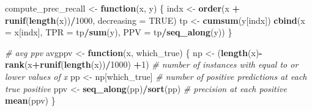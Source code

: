 \documentclass[
]{article}
\newenvironment{Shaded}{\begin{snugshade}}{\end{snugshade}}
\newcommand{\AttributeTok}[1]{\textcolor[rgb]{0.13,0.29,0.53}{#1}}
\newcommand{\CommentTok}[1]{\textcolor[rgb]{0.56,0.35,0.01}{\textit{#1}}}
\newcommand{\ConstantTok}[1]{\textcolor[rgb]{0.56,0.35,0.01}{#1}}
\newcommand{\ControlFlowTok}[1]{\textcolor[rgb]{0.13,0.29,0.53}{\textbf{#1}}}
\newcommand{\DecValTok}[1]{\textcolor[rgb]{0.00,0.00,0.81}{#1}}
\newcommand{\FunctionTok}[1]{\textcolor[rgb]{0.13,0.29,0.53}{\textbf{#1}}}
\newcommand{\NormalTok}[1]{#1}
\newcommand{\OtherTok}[1]{\textcolor[rgb]{0.56,0.35,0.01}{#1}}
\newcommand{\SpecialCharTok}[1]{\textcolor[rgb]{0.81,0.36,0.00}{\textbf{#1}}}
\begin{document}
\begin{Shaded}
\begin{Highlighting}[]
\NormalTok{compute\_prec\_recall }\OtherTok{\textless{}{-}} \ControlFlowTok{function}\NormalTok{(x, y) \{}
\NormalTok{  indx }\OtherTok{\textless{}{-}} \FunctionTok{order}\NormalTok{(x }\SpecialCharTok{+} \FunctionTok{runif}\NormalTok{(}\FunctionTok{length}\NormalTok{(x))}\SpecialCharTok{/}\DecValTok{1000}\NormalTok{, }\AttributeTok{decreasing =} \ConstantTok{TRUE}\NormalTok{)}
\NormalTok{  tp  }\OtherTok{\textless{}{-}} \FunctionTok{cumsum}\NormalTok{(y[indx])}
  \FunctionTok{cbind}\NormalTok{(}\AttributeTok{x =}\NormalTok{ x[indx], }\AttributeTok{TPR =}\NormalTok{ tp}\SpecialCharTok{/}\FunctionTok{sum}\NormalTok{(y), }\AttributeTok{PPV =}\NormalTok{ tp}\SpecialCharTok{/}\FunctionTok{seq\_along}\NormalTok{(y))}
\NormalTok{\}}

\CommentTok{\# avg ppv }
\NormalTok{avgppv }\OtherTok{\textless{}{-}} \ControlFlowTok{function}\NormalTok{(x, which\_true) \{}
\NormalTok{  np  }\OtherTok{\textless{}{-}}\NormalTok{ (}\FunctionTok{length}\NormalTok{(x)}\SpecialCharTok{{-}}\FunctionTok{rank}\NormalTok{(x}\SpecialCharTok{+}\FunctionTok{runif}\NormalTok{(}\FunctionTok{length}\NormalTok{(x))}\SpecialCharTok{/}\DecValTok{1000}\NormalTok{) }\SpecialCharTok{+}\DecValTok{1}\NormalTok{)  }\CommentTok{\# number of instances with equal to or lower values of x}
\NormalTok{  pp  }\OtherTok{\textless{}{-}}\NormalTok{ np[which\_true]                               }\CommentTok{\# number of positive predictions at each true positive    }
\NormalTok{  ppv }\OtherTok{\textless{}{-}} \FunctionTok{seq\_along}\NormalTok{(pp)}\SpecialCharTok{/}\FunctionTok{sort}\NormalTok{(pp)                       }\CommentTok{\# precision at each positive}
  \FunctionTok{mean}\NormalTok{(ppv)}
\NormalTok{\}}
\end{Highlighting}
\end{Shaded}
\end{document}

